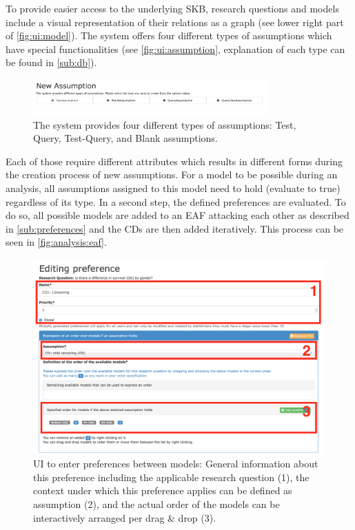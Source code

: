 To provide easier access to the underlying \gls{SKB}, research questions and models include a visual representation of their relations as a graph (see lower right part of \autoref{fig:ui:model}). The system offers four different types of assumptions which have special functionalities (see \autoref{fig:ui:assumption}, explanation of each type can be found in \autoref{sub:db}).

\begin{figure}[t!]
\centering
\includegraphics[width=0.8\textwidth]{figures/ui_new_assumption}
\caption{The system provides four different types of assumptions: Test, Query, Test-Query, and Blank assumptions.}
\label{fig:ui:assumption}
\end{figure}

Each of those require different attributes which results in different forms during the creation process of new assumptions. For a model to be possible during an analysis, all assumptions assigned to this model need to hold (evaluate to true) regardless of its type. In a second step, the defined \glspl{preference} are evaluated. To do so, all possible models are added to an \gls{EAF} attacking each other as described in \autoref{sub:preferences} and the \glspl{CD} are then added iteratively. This process can be seen in \autoref{fig:analysis:eaf}.

\begin{figure}[!hbt]
	\centering
	\includegraphics[width=\textwidth]{figures/ui_preference}
	\caption{\gls{UI} to enter preferences between models: General information about this preference including the applicable research question (1), the context under which this preference applies can be defined as assumption (2), and the actual order of the models can be interactively arranged per drag \& drop (3).}
	\label{fig:ui:preference}
\end{figure}


